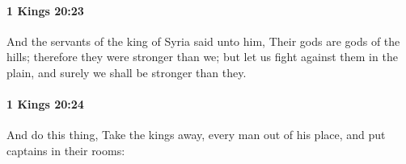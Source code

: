 		\paragraph{1 Kings 20:23} %
			\label{1KINGS-20-23}

			And the servants of the king of Syria said unto him, Their gods are gods of the hills; therefore they were stronger than we; but let us fight against them in the plain, and surely we shall be stronger than they.


		\paragraph{1 Kings 20:24} %
			\label{1KINGS-20-24}

			And do this thing, Take the kings away, every man out of his place, and put captains in their rooms:


